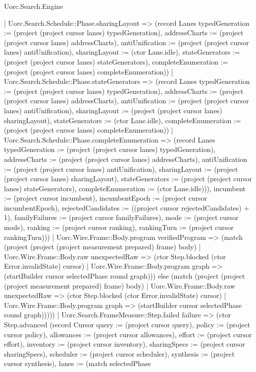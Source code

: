 \begin{lexlean}{Uorc.Search.Engine}
\begin{semanticmodule}
{{            | Uorc.Search.Schedule::Phase.sharingLayout => (record Lanes {typedGeneration := (project (project cursor lanes) typedGeneration), addressCharts := (project (project cursor lanes) addressCharts), antiUnification := (project (project cursor lanes) antiUnification), sharingLayout := (ctor Lane.idle), stateGenerators := (project (project cursor lanes) stateGenerators), completeEnumeration := (project (project cursor lanes) completeEnumeration)})
            | Uorc.Search.Schedule::Phase.stateGenerators => (record Lanes {typedGeneration := (project (project cursor lanes) typedGeneration), addressCharts := (project (project cursor lanes) addressCharts), antiUnification := (project (project cursor lanes) antiUnification), sharingLayout := (project (project cursor lanes) sharingLayout), stateGenerators := (ctor Lane.idle), completeEnumeration := (project (project cursor lanes) completeEnumeration)})
            | Uorc.Search.Schedule::Phase.completeEnumeration => (record Lanes {typedGeneration := (project (project cursor lanes) typedGeneration), addressCharts := (project (project cursor lanes) addressCharts), antiUnification := (project (project cursor lanes) antiUnification), sharingLayout := (project (project cursor lanes) sharingLayout), stateGenerators := (project (project cursor lanes) stateGenerators), completeEnumeration := (ctor Lane.idle)})), incumbent := (project cursor incumbent), incumbentEpoch := (project cursor incumbentEpoch), rejectedCandidates := ((project cursor rejectedCandidates) + 1), familyFailures := (project cursor familyFailures), mode := (project cursor mode), ranking := (project cursor ranking), rankingTurn := (project cursor rankingTurn)}))
          | Uorc.Wire.Frame::Body.program verifiedProgram => (match (project (project (project measurement prepared) frame) body)
            | Uorc.Wire.Frame::Body.raw unexpectedRaw => (ctor Step.blocked (ctor Error.invalidState) cursor)
            | Uorc.Wire.Frame::Body.program graph => (startBuilder cursor selectedPhase round graph))) else (match (project (project (project measurement prepared) frame) body)
          | Uorc.Wire.Frame::Body.raw unexpectedRaw => (ctor Step.blocked (ctor Error.invalidState) cursor)
          | Uorc.Wire.Frame::Body.program graph => (startBuilder cursor selectedPhase round graph)))))
      | Uorc.Search.FrameMeasure::Step.failed failure => (ctor Step.advanced (record Cursor {query := (project cursor query), policy := (project cursor policy), allowances := (project cursor allowances), effort := (project cursor effort), inventory := (project cursor inventory), sharingSpecs := (project cursor sharingSpecs), scheduler := (project cursor scheduler), synthesis := (project cursor synthesis), lanes := (match selectedPhase
}}
\end{semanticmodule}
\end{lexlean}
